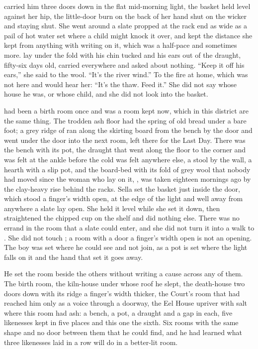 
 carried him three doors down  in the flat mid-morning light, the basket held level against her hip, the little-door burn on the back of her hand shut on the wicker and staying shut. She went around a slate propped at the rack end as wide as a pail of hot water set where a child might knock it over, and kept the distance she kept from anything with writing on it, which was a half-pace and sometimes more.  lay under the fold with his chin tucked and his ears out of the draught, fifty-six days old, carried everywhere and asked about nothing. “Keep it off his ears,” she said to the wool. “It's the river wind.” To the fire at home, which was not here and would hear her: “It's the thaw. Feed it.” She did not say whose house he was, or whose child, and she did not look into the basket.

 had been a birth room once and was a room kept now, which in this district are the same thing. The trodden ash floor had the spring of old bread under a bare foot; a grey ridge of  ran along the skirting board from the bench by the door and went under the door into the next room, left there for the Last Day. There was the bench with its pot, the draught that went along the floor to the corner and was felt at the ankle before the cold was felt anywhere else, a stool by the wall, a hearth with a slip pot, and the board-bed with its fold of grey wool that nobody had moved since the woman who lay on it, , was taken eighteen mornings ago by the clay-heavy rise behind the racks. Sella set the basket just inside the door, which stood a finger's width open, at the edge of the light and well away from anywhere a slate lay open. She held it level while she set it down, then straightened the chipped cup on the shelf and did nothing else. There was no errand in the room that a slate could enter, and she did not turn it into a walk to . She did not touch ; a room with a door a finger's width open is not an opening. The boy was set where he could see and not join, as a pot is set where the light falls on it and the hand that set it goes away.

He set the room beside the others without writing a cause across any of them. The birth room, the kiln-house under whose roof he slept, the death-house two doors down with its ridge a finger's width thicker, the Court's room that had reached him only as a voice through a doorway, the Eel House upriver with salt where this room had ash: a bench, a pot, a draught and a gap in each, five likenesses kept in five places and this one the sixth. Six rooms with the same shape and no door between them that he could find, and he had learned what three likenesses laid in a row will do in a better-lit room.

